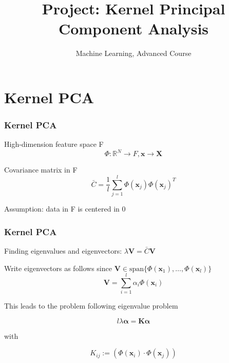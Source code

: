 \documentclass{beamer}
\subtitle[Machine Learning]{Machine Learning, Advanced Course}
\title{Project: Kernel Principal Component Analysis}
\author{\reportauthor}
\institute{KTH Royal Institute of Technology}
\begin{document}
\begin{frame}
 \maketitle
\end{frame}

\begin{frame}
 \tableofcontents
\end{frame}





\section[Theory]{Kernel PCA} %
\begin{frame}
  \frametitle{Kernel PCA} %
    High-dimension feature space F
    \begin{equation} \label{eq:space_definition}
        \Phi : \mathbb{R}^N \rightarrow F, \textbf{x} \rightarrow \textbf{X}
    \end{equation}

    Covariance matrix in F
    \begin{equation} \label{eq:cov_matrix}
        \bar{C} = \frac{1}{l} \sum\limits_{j=1}^{l} \Phi(\textbf{x}_j) \Phi(\textbf{x}_j)^T
    \end{equation}
    
    Assumption: data in F is centered in 0
\end{frame}

\begin{frame}
  \frametitle{Kernel PCA} %
    Finding eigenvalues and eigenvectors: $\lambda\textbf{V}=\bar{C}\textbf{V}$
    
    Write eigenvectors as follows since $\textbf{V}\in \text{span}\{ \Phi(\textbf{x}_1),\dots,\Phi(\textbf{x}_l)\} $
    \begin{equation} 
\textbf{V} = \sum\limits_{i=1}^{l} \alpha_i \Phi(\textbf{x}_i)
    \end{equation}    
    

   This leads to the problem following eigenvalue problem
   
       \begin{equation} \label{eq:solution}
        l \lambda \boldsymbol{\alpha} = \textbf{K} \boldsymbol{\alpha}
    \end{equation}
    
    with
    
    \begin{equation} \label{eq:k_matrix}
        K_{ij} := (\Phi(\textbf{x}_i) \cdot \Phi(\textbf{x}_j))
    \end{equation}

\end{frame}
\end{document}
